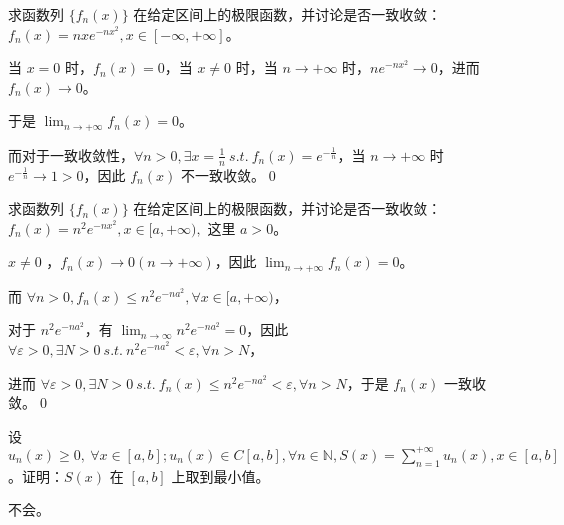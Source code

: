 \begin{ques}
	求函数列 $\displaystyle \{f_{n}( x)\}$ 在给定区间上的极限函数，并讨论是否一致收敛：$\displaystyle f_{n}( x) =nxe^{-nx^{2}} ,x\in [ -\infty ,+\infty ]$。
\end{ques}



当 $\displaystyle x=0$ 时，$\displaystyle f_{n}( x) =0$，当 $\displaystyle x\neq 0$ 时，当 $\displaystyle n\rightarrow +\infty $ 时，$\displaystyle ne^{-nx^{2}}\rightarrow 0$，进而 $\displaystyle f_{n}( x)\rightarrow 0$。

于是 $\displaystyle \lim _{n\rightarrow +\infty } f_{n}( x) =0$。

而对于一致收敛性，$\displaystyle \forall n >0,\exists x=\frac{1}{n} \ s.t.\ f_{n}( x) =e^{-\frac{1}{n}}$，当 $\displaystyle n\rightarrow +\infty $ 时 $\displaystyle e^{-\frac{1}{n}}\rightarrow 1 >0$，因此 $\displaystyle f_{n}( x)$ 不一致收敛。\qed 



\begin{ques}
	求函数列 $\displaystyle \{f_{n}( x)\}$ 在给定区间上的极限函数，并讨论是否一致收敛：$\displaystyle f_{n}( x) =n^{2} e^{-nx^{2}} ,x\in [ a,+\infty ) ,$ 这里 $\displaystyle a >0$。
\end{ques}



$\displaystyle x\neq 0$ ，$\displaystyle f_{n}( x)\rightarrow 0\left( n\rightarrow +\infty \right)$，因此 $\displaystyle \lim _{n\rightarrow +\infty } f_{n}( x) =0$。

而 $\displaystyle \forall n >0,f_{n}( x) \leqslant n^{2} e^{-na^{2}} ,\forall x\in [ a,+\infty )$，

对于 $\displaystyle n^{2} e^{-na^{2}}$，有 $\displaystyle \lim _{n\rightarrow \infty } n^{2} e^{-na^{2}} =0$，因此 $\displaystyle \forall \varepsilon  >0,\exists N >0\ s.t.\ n^{2} e^{-na^{2}} < \varepsilon ,\forall n >N$，

进而 $\displaystyle \forall \varepsilon  >0,\exists N >0\ s.t.\ f_{n}( x) \leqslant n^{2} e^{-na^{2}} < \varepsilon ,\forall n >N$，于是 $\displaystyle f_{n}( x)$ 一致收敛。\qed 



\begin{ques}
	设 $\displaystyle u_{n}( x) \geqslant 0,\ \forall x\in [ a,b] ;u_{n}( x) \in C[ a,b] ,\forall n\in \mathbb{N} ,S( x) =\sum _{n=1}^{+\infty } u_{n}( x) ,x\in [ a,b]$。证明：$\displaystyle S( x)$ 在 $\displaystyle [ a,b]$ 上取到最小值。
\end{ques}



不会。


\ifx\allfiles\undefined

\fi
